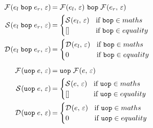 \documentclass[../main.tex]{subfiles}
\begin{document}
\begin{align*}
    \reduce{F}{\bopexpr{e_l}{e_r}} &= \bopexpr{\reduce{F}{e_l}}{\reduce{F}{e_r}} \\
    \reduce{S}{\bopexpr{e_l}{e_r}} &= \begin{cases}
            \reduce{S}{e_l} &\text{if } \texttt{bop} \in maths \\
            []              &\text{if } \texttt{bop} \in equality
        \end{cases} \\
    \reduce{D}{\bopexpr{e_l}{e_r}} &= \begin{cases}
            \reduce{D}{e_l} &\text{if } \texttt{bop} \in maths \\
            0               &\text{if } \texttt{bop} \in equality
        \end{cases}
\\[5pt]
    \reduce{F}{\uopexpr{e}} &= \uopexpr{\reduce{F}{e}} \\
    \reduce{S}{\uopexpr{e}} &= \begin{cases}
            \reduce{S}{e} &\text{if } \texttt{uop} \in maths \\
            []            &\text{if } \texttt{uop} \in equality
        \end{cases} \\
    \reduce{D}{\uopexpr{e}} &= \begin{cases}
            \reduce{D}{e} &\text{if } \texttt{uop} \in maths \\
            0             &\text{if } \texttt{uop} \in equality
        \end{cases}
\end{align*}
\end{document}

